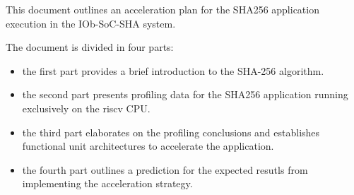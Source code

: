 This document outlines an acceleration plan for the SHA256 application
execution in the IOb-SoC-SHA system.

The document is divided in four parts: 
\begin{itemize}

\item the first part provides a brief introduction to the SHA-256 algorithm.

\item the second part presents profiling data for the SHA256 application
    running exclusively on the riscv CPU.

\item the third part elaborates on the profiling conclusions and establishes
    functional unit architectures to accelerate the application.

\item the fourth part outlines a prediction for the expected resutls from
    implementing the acceleration strategy.

\end{itemize}











